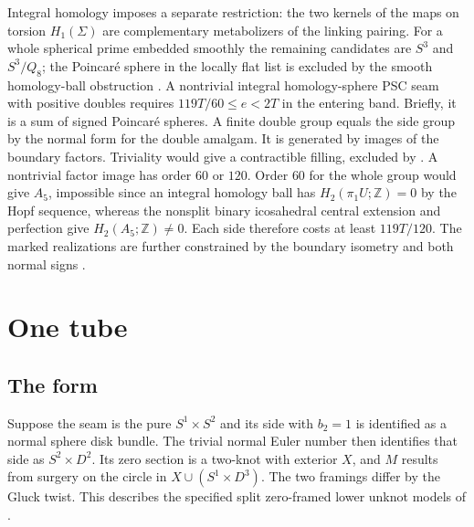 \documentclass[11pt,letterpaper]{article}
\numberwithin{equation}{section}
\theoremstyle{definition}
\begin{document}
Integral homology imposes a separate restriction: the two kernels of the
maps on torsion \(H_1(\Sigma)\) are complementary metabolizers of the
linking pairing. For a whole spherical prime embedded smoothly the
remaining candidates are \(S^3\) and \(S^3/Q_8\); the Poincar\'e sphere
in the locally flat list is excluded by the smooth homology-ball
obstruction \cite[Theorem 5.2]{Hillman2024LocallyFlat}
\cite[Theorem 1.2 and \S8.1]{OzsvathSzabo2003Graded}.
A nontrivial integral homology-sphere PSC seam with positive doubles
requires \(119T/60\le e<2T\) in the entering band. Briefly, it is a
sum of signed Poincar\'e spheres. A finite double group equals the side
group by the normal form for the double amalgam. It is generated by
images of the boundary factors. Triviality would give a contractible
filling, excluded by \cite[Proposition 4.2]{ChodoshMaximoMukherjee2024Complete}.
A nontrivial factor image has order \(60\) or \(120\). Order \(60\) for
the whole group would give \(A_5\), impossible since an integral homology
ball has \(H_2(\pi_1U;\mathbb Z)=0\) by the Hopf sequence, whereas
the nonsplit binary icosahedral central extension and perfection give
\(H_2(A_5;\mathbb Z)\ne0\). Each side therefore costs at least
\(119T/120\). The marked realizations are further constrained by the
boundary isometry and both normal signs
\cite[SEAM, finite covers and paired fillings]{Baker2026MarkedCutCalculations}.

\section{One tube}\label{sec:tube}

\subsection{The form}
Suppose the seam is the pure \(S^1\times S^2\) and its side with
\(b_2=1\) is identified as a normal sphere disk bundle. The trivial
normal Euler number then identifies that side as \(S^2\times D^2\).
Its zero section is a two-knot with exterior \(X\), and \(M\) results
from surgery on the circle in \(X\cup(S^1\times D^3)\). The two
framings differ by the Gluck twist. This describes the specified split
zero-framed lower unknot models of \cite{Baker2026HandleCuts}.
\end{document}

